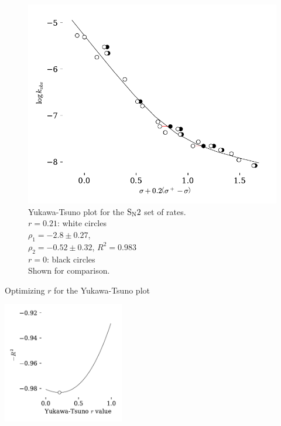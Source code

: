 \documentclass{tufte-handout}
\begin{document}
\begin{figure}[h!]
  \centering
  \includegraphics[scale=0.8]{images/plot11.pdf}
  \caption[-5mm]{Yukawa-Tsuno plot for the $\rm S_N2$ set of rates.  \vspace{2mm} \\
  {$r = 0.21$}: white circles  \\
  \hspace{3mm} $\rho_1 = -2.8 \pm 0.27$,   \\
  \hspace{3mm} $\rho_2 = -0.52 \pm 0.32$, $R^2 = 0.983$ \vspace{2mm} \\
  {$r = 0$}: black circles  \\
  \hspace{3mm} Shown for comparison. \vspace{2mm} \\

   
 } 
  \label{fig:YK5}
\end{figure}

\begin{marginfigure}[-25mm]
  \centering
    \caption[-0mm]{Optimizing $r$ for the Yukawa-Tsuno plot \label{fig:YK5R}}  
    \includegraphics[width=150pt]{images/plot11R.pdf}
\end{marginfigure}
\end{document}
